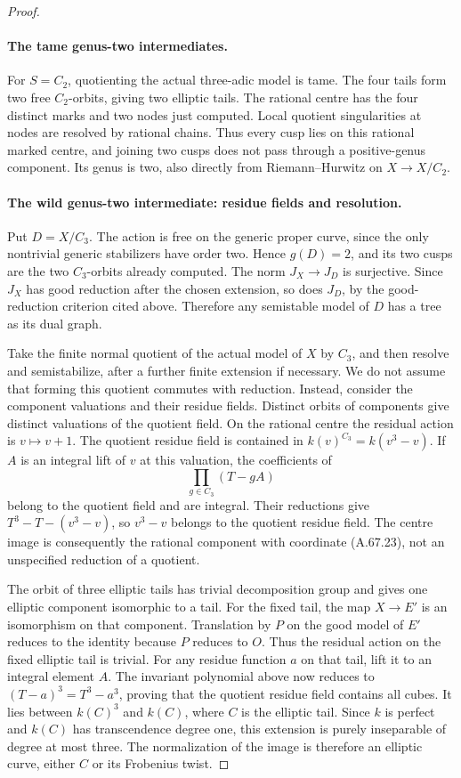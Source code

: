 \begin{proof}
\paragraph{The tame genus-two intermediates.}
For \(S=C_2\), quotienting the actual three-adic model is tame.
The four tails form two free \(C_2\)-orbits, giving two elliptic
tails. The rational centre has the four distinct marks and
two nodes just computed. Local quotient singularities at
nodes are resolved by rational chains. Thus every cusp lies
on this rational marked centre, and joining two cusps does
not pass through a positive-genus component. Its genus is
two, also directly from Riemann--Hurwitz on \(X\to X/C_2\).

\paragraph{The wild genus-two intermediate: residue fields and resolution.}
Put \(D=X/C_3\). The action is free on the generic proper curve,
since the only nontrivial generic stabilizers have order two.
Hence \(g(D)=2\), and its two cusps are the two \(C_3\)-orbits
already computed. The norm \(J_X\to J_D\) is surjective. Since
\(J_X\) has good reduction after the chosen extension, so does
\(J_D\), by the good-reduction criterion cited above. Therefore
any semistable model of \(D\) has a tree as its dual graph.

Take the finite normal quotient of the actual model of \(X\)
by \(C_3\), and then resolve and semistabilize, after a further
finite extension if necessary. We do not assume that forming
this quotient commutes with reduction. Instead, consider the
component valuations and their residue fields. Distinct
orbits of components give distinct valuations of the quotient
field. On the rational centre the residual action is
\(v\mapsto v+1\). The quotient residue field is contained in
\(k(v)^{C_3}=k(v^3-v)\). If \(A\) is an integral lift of \(v\)
at this valuation, the coefficients of
\[
                      \prod_{g\in C_3}(T-gA)
\]
belong to the quotient field and are integral. Their
reductions give \(T^3-T-(v^3-v)\), so \(v^3-v\) belongs to the
quotient residue field. The centre image is consequently
the rational component with coordinate (A.67.23), not an
unspecified reduction of a quotient.

The orbit of three elliptic tails has trivial decomposition
group and gives one elliptic component isomorphic to a tail.
For the fixed tail, the map \(X\to E'\) is an isomorphism on
that component. Translation by \(P\) on the good model of
\(E'\) reduces to the identity because \(P\) reduces to \(O\).
Thus the residual action on the fixed elliptic tail is
trivial. For any residue function \(a\) on that tail, lift it
to an integral element \(A\). The invariant polynomial above
now reduces to \((T-a)^3=T^3-a^3\), proving that the quotient
residue field contains all cubes. It lies between \(k(C)^3\)
and \(k(C)\), where \(C\) is the elliptic tail. Since \(k\)
is perfect and \(k(C)\) has transcendence degree one, this
extension is purely inseparable of degree at most three.
The normalization of the image is therefore an elliptic
curve, either \(C\) or its Frobenius twist.


\end{proof}
